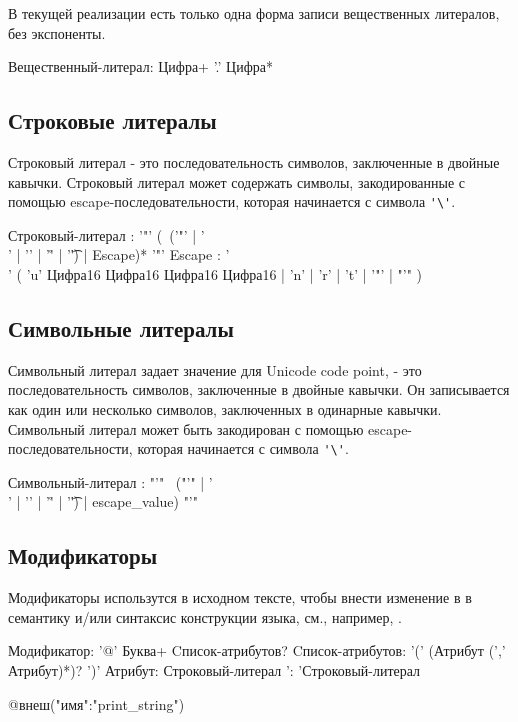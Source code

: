 В текущей реализации есть только одна форма записи вещественных литералов, без экспоненты.

\begin{Grammar}
Вещественный-литерал: Цифра+ '.' Цифра*
\end{Grammar}      

\hypertarget{strlit}{%
\subsection{Строковые литералы}\label{lex:strlit}}

Строковый литерал - это последовательность символов, заключенные в двойные кавычки. Строковый литерал может содержать символы, закодированные с помощью escape-последовательности, которая начинается с символа \verb+'\'+.

\begin{Grammar}
Строковый-литерал
    : '"'
    (~('"' | '\\' | '\n' | '\r' | '\t') | Escape)* 
    '"' 
Escape
    : '\\'
    ( 'u' Цифра16 Цифра16 Цифра16 Цифра16
    | 'n' | 'r' | 't' 
    | '"'
    | "'"
    )
\end{Grammar}  

\hypertarget{symlit}{%
\subsection{Символьные литералы}\label{lex:symlit}}

Символьный литерал задает значение для Unicode code point, - это последовательность символов, заключенные в двойные кавычки.
Он записывается как один или несколько символов, заключенных в одинарные кавычки. Символьный литерал может быть закодирован с помощью escape-последовательности, которая начинается с символа \verb+'\'+.

\begin{Grammar}
Символьный-литерал
    : "'" 
    ~("'" | '\\' | '\n' | '\r' | '\t') | escape_value)
    "'"
\end{Grammar}  

\hypertarget{modifiers}{%
\subsection{Модификаторы}\label{lex:modifiers}}

Модификаторы использутся в исходном тексте, чтобы внести изменение в в семантику и/или синтаксис конструкции языка, см., например, .

\begin{Grammar}
Модификатор: '@' Буква+ Cписок-атрибутов?
Cписок-атрибутов: '(' (Атрибут (',' Атрибут)*)? ')'
Атрибут: Строковый-литерал ': 'Строковый-литерал
\end{Grammar}  

\begin{Trivil}
@внеш("имя":"print_string")
\end{Trivil}
